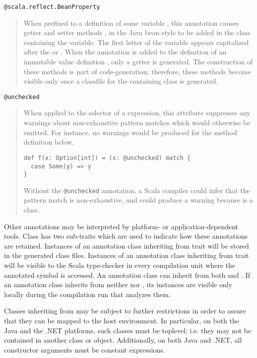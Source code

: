 {\lstinline^@scala.reflect.BeanProperty^
\begin{quote}
When prefixed to a definition of some variable , this
annotation causes getter and setter methods , 
in the Java bean style to be added in the class containing the
variable. The first letter of the variable appears capitalized after
the  or . When the annotation is added to the
definition of an immutable value definition , only a getter is
generated. The construction of these methods is part of
code-generation; therefore, these methods become visible only once a
classfile for the containing class is generated.
\end{quote}

\lstinline^@unchecked^
\begin{quote}
When applied to the selector of a \lstinline@match@ expression,
this attribute suppresses any warnings about non-exhaustive pattern
matches which would otherwise be emitted. For instance, no warnings
would be produced for the method definition below.
\begin{lstlisting}
def f(x: Option[int]) = (x: @unchecked) match {
  case Some(y) => y
}
\end{lstlisting}
Without the \lstinline^@unchecked^ annotation, a Scala compiler could
infer that the pattern match is non-exhaustive, and could produce a
warning because \lstinline@Option@ is a \lstinline@sealed@ class.
\end{quote}

Other annotations may be interpreted by platform- or
application-dependent tools. Class  has two
sub-traits which are used to indicate how these annotations are
retained. Instances of an annotation class inheriting from trait
 will be stored in the generated class
files. Instances of an annotation class inheriting from trait
 will be visible to the Scala type-checker
in every compilation unit where the annotated symbol is accessed. An
annotation class can inherit from both 
and . If an annotation class inherits from
neither  nor
, its instances are visible only locally
during the compilation run that analyzes them.

Classes inheriting from  may be
subject to further restrictions in order to assure that they can be
mapped to the host environment. In particular, on both the Java and
the .NET platforms, such classes must be toplevel; i.e. they may not
be contained in another class or object.  Additionally, on both
Java and .NET, all constructor arguments must be constant expressions.

}
